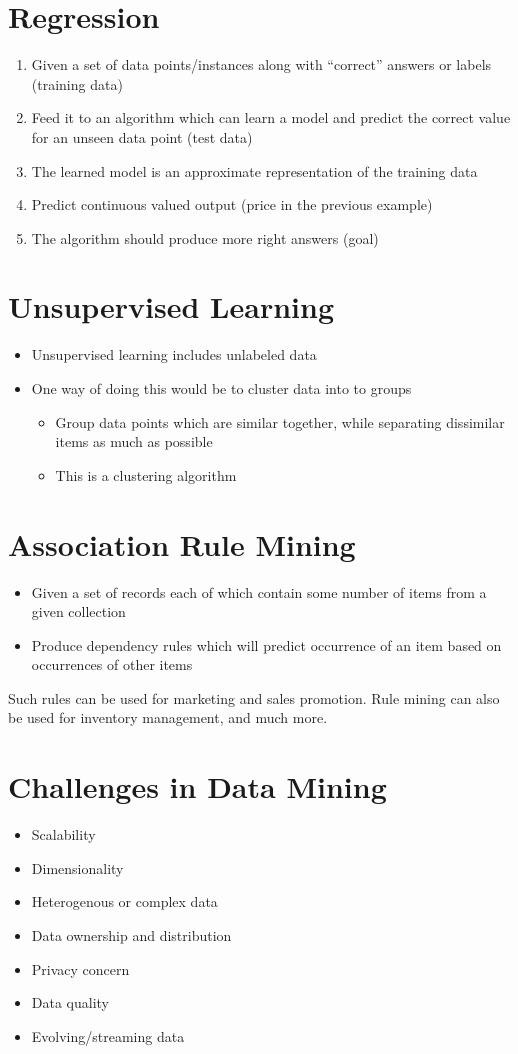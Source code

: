 \section{Regression}
\begin{enumerate}
    \item Given a set of data points/instances along with “correct” answers or 
    labels (training data)
    \item Feed it to an algorithm which can learn a model and predict the 
    correct value for an unseen data point (test data)
    \item The learned model is an approximate representation of the training 
    data
    \item Predict continuous valued output (price in the previous example)
    \item The algorithm should produce more right answers (goal)
\end{enumerate}

\section{Unsupervised Learning}
\begin{itemize}
    \item Unsupervised learning includes unlabeled data
    \item One way of doing this would be to cluster data into to groups
    \begin{itemize}
        \item Group data points which are similar together, while separating 
        dissimilar items as much as possible
        \item This is a clustering algorithm
    \end{itemize}
\end{itemize}

\section{Association Rule Mining}
\begin{itemize}
    \item Given a set of records each of which contain some number of items from a given collection
    \item Produce dependency rules which will predict occurrence of an item based on occurrences of other items
\end{itemize}
Such rules can be used for marketing and sales promotion. Rule mining can also be used for inventory management, and much more.

\section{Challenges in Data Mining}
\begin{itemize}
    \item Scalability
    \item Dimensionality
    \item Heterogenous or complex data
    \item Data ownership and distribution
    \item Privacy concern
    \item Data quality
    \item Evolving/streaming data
\end{itemize}

